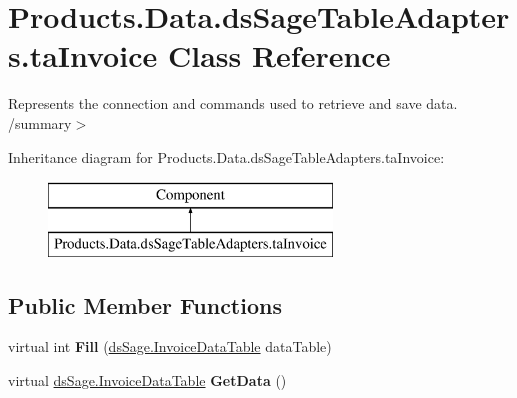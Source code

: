 \hypertarget{class_products_1_1_data_1_1ds_sage_table_adapters_1_1ta_invoice}{}\section{Products.\+Data.\+ds\+Sage\+Table\+Adapters.\+ta\+Invoice Class Reference}
\label{class_products_1_1_data_1_1ds_sage_table_adapters_1_1ta_invoice}


Represents the connection and commands used to retrieve and save data. /summary$>$  


Inheritance diagram for Products.\+Data.\+ds\+Sage\+Table\+Adapters.\+ta\+Invoice\+:\begin{figure}[H]
\begin{center}
\leavevmode
\includegraphics[height=2.000000cm]{class_products_1_1_data_1_1ds_sage_table_adapters_1_1ta_invoice}
\end{center}
\end{figure}
\subsection*{Public Member Functions}
\begin{DoxyCompactItemize}
\item 
virtual int {\bfseries Fill} (\hyperlink{class_products_1_1_data_1_1ds_sage_1_1_invoice_data_table}{ds\+Sage.\+Invoice\+Data\+Table} data\+Table)\hypertarget{class_products_1_1_data_1_1ds_sage_table_adapters_1_1ta_invoice_a5651cf7abaec5a8c7f7df43f0804b894}{}\label{class_products_1_1_data_1_1ds_sage_table_adapters_1_1ta_invoice_a5651cf7abaec5a8c7f7df43f0804b894}

\item 
virtual \hyperlink{class_products_1_1_data_1_1ds_sage_1_1_invoice_data_table}{ds\+Sage.\+Invoice\+Data\+Table} {\bfseries Get\+Data} ()\hypertarget{class_products_1_1_data_1_1ds_sage_table_adapters_1_1ta_invoice_ae266039272322dfa572e9d7ebf0b4200}{}\label{class_products_1_1_data_1_1ds_sage_table_adapters_1_1ta_invoice_ae266039272322dfa572e9d7ebf0b4200}

\end{DoxyCompactItemize}
